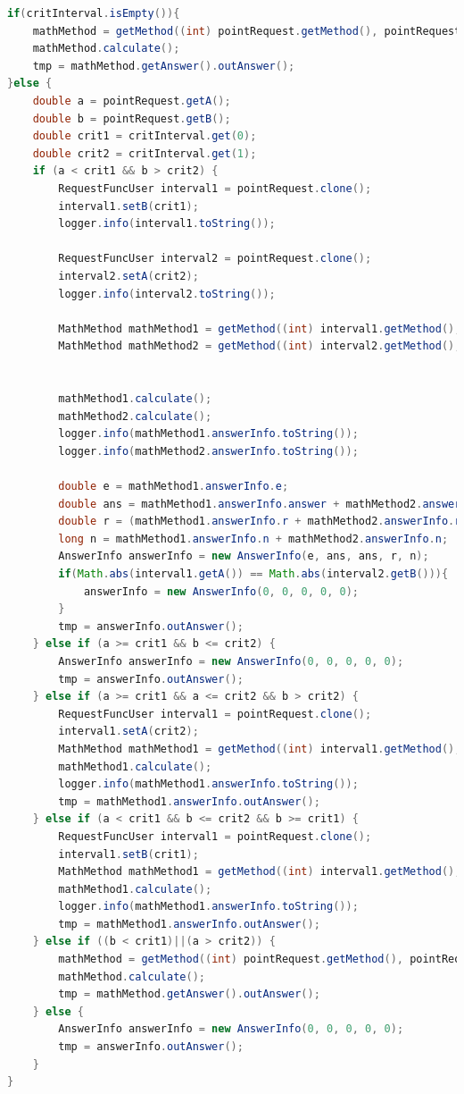 \documentclass{article}
\begin{document}
\begin{lstlisting}[language=Java, caption={Второй узел валидации}]
if(critInterval.isEmpty()){
    mathMethod = getMethod((int) pointRequest.getMethod(), pointRequest);
    mathMethod.calculate();
    tmp = mathMethod.getAnswer().outAnswer();
}else {
    double a = pointRequest.getA();
    double b = pointRequest.getB();
    double crit1 = critInterval.get(0);
    double crit2 = critInterval.get(1);
    if (a < crit1 && b > crit2) {
        RequestFuncUser interval1 = pointRequest.clone();
        interval1.setB(crit1);
        logger.info(interval1.toString());

        RequestFuncUser interval2 = pointRequest.clone();
        interval2.setA(crit2);
        logger.info(interval2.toString());

        MathMethod mathMethod1 = getMethod((int) interval1.getMethod(), interval1);
        MathMethod mathMethod2 = getMethod((int) interval2.getMethod(), interval2);


        mathMethod1.calculate();
        mathMethod2.calculate();
        logger.info(mathMethod1.answerInfo.toString());
        logger.info(mathMethod2.answerInfo.toString());

        double e = mathMethod1.answerInfo.e;
        double ans = mathMethod1.answerInfo.answer + mathMethod2.answerInfo.answer;
        double r = (mathMethod1.answerInfo.r + mathMethod2.answerInfo.r)/2;
        long n = mathMethod1.answerInfo.n + mathMethod2.answerInfo.n;
        AnswerInfo answerInfo = new AnswerInfo(e, ans, ans, r, n);
        if(Math.abs(interval1.getA()) == Math.abs(interval2.getB())){
            answerInfo = new AnswerInfo(0, 0, 0, 0, 0);
        }
        tmp = answerInfo.outAnswer();
    } else if (a >= crit1 && b <= crit2) {
        AnswerInfo answerInfo = new AnswerInfo(0, 0, 0, 0, 0);
        tmp = answerInfo.outAnswer();
    } else if (a >= crit1 && a <= crit2 && b > crit2) {
        RequestFuncUser interval1 = pointRequest.clone();
        interval1.setA(crit2);
        MathMethod mathMethod1 = getMethod((int) interval1.getMethod(), interval1);
        mathMethod1.calculate();
        logger.info(mathMethod1.answerInfo.toString());
        tmp = mathMethod1.answerInfo.outAnswer();
    } else if (a < crit1 && b <= crit2 && b >= crit1) {
        RequestFuncUser interval1 = pointRequest.clone();
        interval1.setB(crit1);
        MathMethod mathMethod1 = getMethod((int) interval1.getMethod(), interval1);
        mathMethod1.calculate();
        logger.info(mathMethod1.answerInfo.toString());
        tmp = mathMethod1.answerInfo.outAnswer();
    } else if ((b < crit1)||(a > crit2)) {
        mathMethod = getMethod((int) pointRequest.getMethod(), pointRequest);
        mathMethod.calculate();
        tmp = mathMethod.getAnswer().outAnswer();
    } else {
        AnswerInfo answerInfo = new AnswerInfo(0, 0, 0, 0, 0);
        tmp = answerInfo.outAnswer();
    }
}
    \end{lstlisting}
\end{document}
